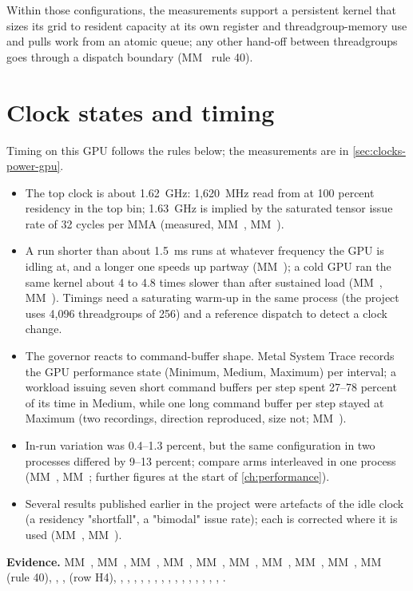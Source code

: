 Within those configurations, the measurements support a persistent kernel that sizes its grid to resident capacity at
its own register and threadgroup-memory use and pulls work from an atomic queue; any other hand-off between
threadgroups goes through a dispatch boundary (MM~ rule 40).

\section{Clock states and timing}\label{sec:clocks-performance-states}

Timing on this GPU follows the rules below; the measurements are in \cref{sec:clocks-power-gpu}.

\begin{itemize}
\item The top clock is about 1.62~GHz: 1,620~MHz read from  at 100 percent residency in the top bin;
  1.63~GHz is implied by the saturated tensor issue rate of 32 cycles per MMA (measured, MM~, MM~).
\item A run shorter than about 1.5~ms runs at whatever frequency the GPU is
  idling at, and a longer one speeds up partway (MM~); a cold GPU ran the same kernel about 4 to 4.8 times slower
  than after sustained load (MM~, MM~). Timings need a saturating warm-up in the same process (the project uses
  4,096 threadgroups of 256) and a reference dispatch to detect a clock change.
\item The governor reacts to command-buffer shape. Metal System Trace records the GPU performance state (Minimum,
  Medium, Maximum) per interval; a workload issuing seven short command buffers per step spent 27–78 percent of its time
  in Medium, while one long command buffer per step stayed at Maximum (two recordings, direction reproduced, size not;
  MM~).
\item In-run variation was 0.4–1.3 percent, but the same configuration in two
  processes differed by 9–13 percent; compare arms interleaved in one process (MM~, MM~; further figures at the start of \cref{ch:performance}).
\item Several results published earlier in the project were artefacts of the idle clock (a
  residency "shortfall", a "bimodal" issue rate); each is corrected where it is used (MM~, MM~).
\end{itemize}

\textbf{Evidence.} MM~, MM~, MM~, MM~, MM~, MM~, MM~, MM~, MM~, MM~ (rule 40), , ,  (row H4),
, , , , , , , , , , ,
, , , , .
